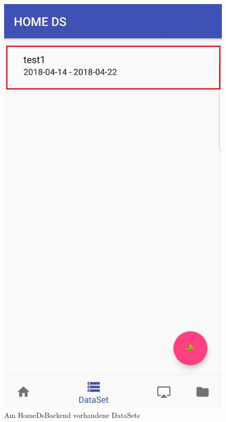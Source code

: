 \begin{figure}[H]
\centering
\includegraphics[scale=0.1]{images/06_AndroidApp/06_DataSetsToSHow}
\caption{Am HomeDsBackend vorhandene DataSets}
\label{fig:06_DataSetsToSHow}
\end{figure}

